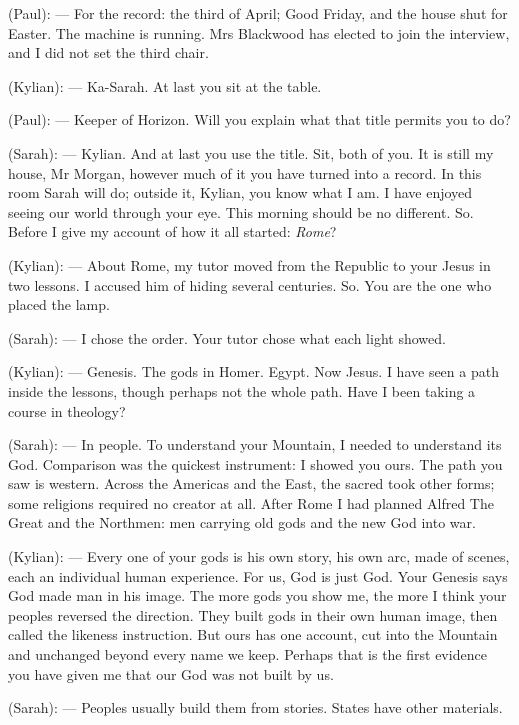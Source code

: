 
\begin{room}

(Paul): --- For the record: the third of April; Good Friday, and the house shut for Easter. The machine is running. Mrs Blackwood has elected to join the interview, and I did not set the third chair.

(Kylian): --- Ka-Sarah. At last you sit at the table.

(Paul): --- Keeper of Horizon. Will you explain what that title permits you to do?

(Sarah): --- Kylian. And at last you use the title. Sit, both of you. It is still my house, Mr Morgan, however much of it you have turned into a record. In this room Sarah will do; outside it, Kylian, you know what I am. I have enjoyed seeing our world through your eye. This morning should be no different. So. Before I give my account of how it all started: \textit{Rome}?

(Kylian): --- About Rome, my tutor moved from the Republic to your Jesus in two lessons. I accused him of hiding several centuries. So. You are the one who placed the lamp.

(Sarah): --- I chose the order. Your tutor chose what each light showed.

(Kylian): --- Genesis. The gods in Homer. Egypt. Now Jesus. I have seen a path inside the lessons, though perhaps not the whole path. Have I been taking a course in theology?

(Sarah): --- In people. To understand your Mountain, I needed to understand its God. Comparison was the quickest instrument: I showed you ours. The path you saw is western. Across the Americas and the East, the sacred took other forms; some religions required no creator at all. After Rome I had planned Alfred The Great and the Northmen: men carrying old gods and the new God into war. 

(Kylian): --- Every one of your gods is his own story, his own arc, made of scenes, each an individual human experience. For us, God is just God. Your Genesis says God made man in his image. The more gods you show me, the more I think your peoples reversed the direction. They built gods in their own human image, then called the likeness instruction. But ours has one account, cut into the Mountain and unchanged beyond every name we keep. Perhaps that is the first evidence you have given me that our God was not built by us.

(Sarah): --- Peoples usually build them from stories. States have other materials.


\end{room}
